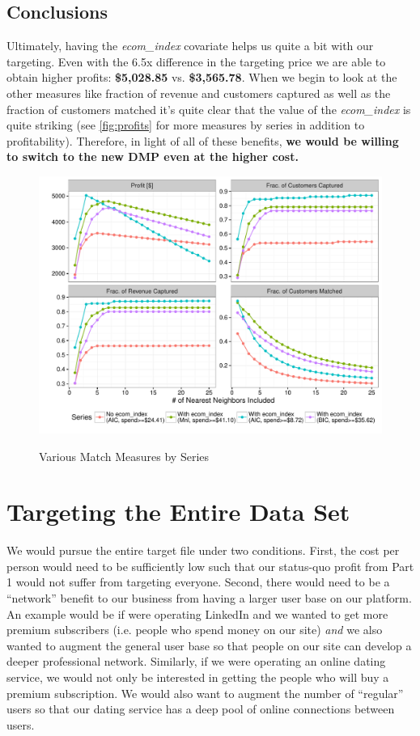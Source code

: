 


\subsection{Conclusions}
Ultimately, having the \textit{ecom\_index} covariate helps us quite a bit with our targeting.  Even with the 6.5x difference in the targeting price we are able to obtain higher profits: \textbf{\$5,028.85} vs. \textbf{\$3,565.78}.  When we begin to look at the other measures like fraction of revenue and customers captured as well as the fraction of customers matched it's quite clear that the value of the \textit{ecom\_index} is quite striking (see \vref{fig:profits} for more measures by series in addition to profitability).  Therefore, in light of all of these benefits, \textbf{we would be willing to switch to the new DMP even at the higher cost.}

\begin{figure}[!htb]
  \centering
  \caption{Various Match Measures by Series}
  \includegraphics[scale=.75]{profits2.pdf}
  \label{fig:profits}
\end{figure}

\section{Targeting the Entire Data Set} %
We would pursue the entire target file under two conditions. First, the cost per person would need to be sufficiently low such that our status-quo profit from Part 1 would not suffer from targeting everyone. Second, there would need to be a “network” benefit to our business from having a larger user base on our platform. An example would be if were operating LinkedIn and we wanted to get more premium subscribers (i.e. people who spend money on our site) \textit{and} we also wanted to augment the general user base so that people on our site can develop a deeper professional network. Similarly, if we were operating an online dating service, we would not only be interested in getting the people who will buy a premium subscription. We would also want to augment the number of “regular” users so that our dating service has a deep pool of online connections between users.

